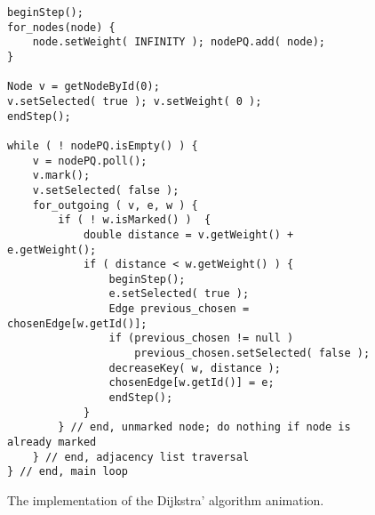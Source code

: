 \begin{figure}[t]

\small
\begin{verbatim}
beginStep();
for_nodes(node) {
    node.setWeight( INFINITY ); nodePQ.add( node);
}

Node v = getNodeById(0);
v.setSelected( true ); v.setWeight( 0 );
endStep();

while ( ! nodePQ.isEmpty() ) {
    v = nodePQ.poll();
    v.mark();
    v.setSelected( false );
    for_outgoing ( v, e, w ) {
        if ( ! w.isMarked() )  {
            double distance = v.getWeight() + e.getWeight();
            if ( distance < w.getWeight() ) {
                beginStep();
                e.setSelected( true );
                Edge previous_chosen = chosenEdge[w.getId()];
                if (previous_chosen != null )
                    previous_chosen.setSelected( false );
                decreaseKey( w, distance );
                chosenEdge[w.getId()] = e;
                endStep();
            }
        } // end, unmarked node; do nothing if node is already marked
    } // end, adjacency list traversal
} // end, main loop
\end{verbatim}

\caption{The implementation of the Dijkstra' algorithm animation.}
\label{fig:dijkstra}
\end{figure}
